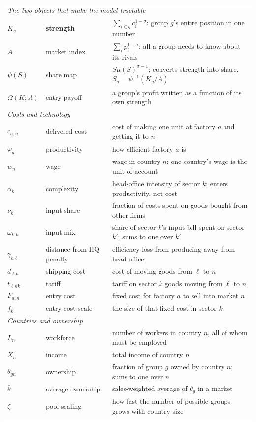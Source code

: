 \documentclass[11pt]{article}
\theoremstyle{plain}
\theoremstyle{remark}
\theoremstyle{definition}
\begin{document}
\begin{center}
\begin{longtable}{ll p{8.4cm}}
\multicolumn{3}{l}{\emph{The two objects that make the model tractable}}\\
$K_g$ & \textbf{strength} & $\sum_{i\in g}c_i^{1-\sigma}$: group $g$'s entire position in one number\\
$A$ & market index & $\sum_i p_i^{1-\sigma}$: all a group needs to know about its rivals\\
$\psi(S)$ & share map & $S\mu(S)^{\sigma-1}$; converts strength into share, $S_g=\psi^{-1}(K_g/A)$\\
$\Omega(K;A)$ & entry payoff & a group's profit written as a function of its own strength\\
\midrule
\multicolumn{3}{l}{\emph{Costs and technology}}\\
$c_{a,n}$ & delivered cost & cost of making one unit at factory $a$ and getting it to $n$\\
$\varphi_a$ & productivity & how efficient factory $a$ is\\
$w_n$ & wage & wage in country $n$; one country's wage is the unit of account\\
$\alpha_k$ & complexity & head-office intensity of sector $k$; enters productivity, not cost\\
$\nu_k$ & input share & fraction of costs spent on goods bought from other firms\\
$\omega_{k'k}$ & input mix & share of sector $k$'s input bill spent on sector $k'$; sums to one over $k'$\\
$\gamma_{h\ell}$ & distance-from-HQ penalty & efficiency loss from producing away from head office\\
$d_{\ell n}$ & shipping cost & cost of moving goods from $\ell$ to $n$\\
$t_{\ell n k}$ & tariff & tariff on sector $k$ goods moving from $\ell$ to $n$\\
$F_{a,n}$ & entry cost & fixed cost for factory $a$ to sell into market $n$\\
$f_k$ & entry-cost scale & the size of that fixed cost in sector $k$\\
\midrule
\multicolumn{3}{l}{\emph{Countries and ownership}}\\
$L_n$ & workforce & number of workers in country $n$, all of whom must be employed\\
$X_n$ & income & total income of country $n$\\
$\theta_{gn}$ & ownership & fraction of group $g$ owned by country $n$; sums to one over $n$\\
$\bar\theta$ & average ownership & sales-weighted average of $\theta_g$ in a market\\
$\zeta$ & pool scaling & how fast the number of possible groups grows with country size\\
\bottomrule
\end{longtable}
\end{center}
\end{document}
